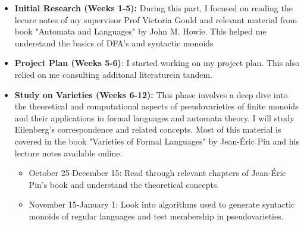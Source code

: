 \begin{itemize}
	\item \textbf{Initial Research (Weeks 1-5):}  During this part, I focused on reading the lecure notes of my supervisor Prof Victoria Gould and relevant material from book "Automata and Languages" by John M. Howie. This helped me understand the basics of DFA's and syntactic monoids
	\item \textbf{Project Plan (Weeks 5-6)}: I started working on my project plan. This also relied on me consulting additonal literaturein tandem.
	\item \textbf{Study on Varieties (Weeks 6-12):} This phase involves a deep dive into the theoretical and computational aspects of pseudovarieties of finite monoids and their applications in formal languages and automata theory. I will study Eilenberg's correspondence and related concepts. Most of this material is covered in the book "Varieties of Formal Languages" by Jean-Éric Pin and his lecture notes available online.
	\begin{itemize}
		\item October 25-December 15: Read through relevant chapters of Jean-Éric Pin's book and understand the theoretical concepts.
		\item November 15-January 1: Look into algorithms used to generate syntactic monoids of regular languages and test membership in pseudovarieties.
	\end{itemize}
	
\end{itemize}